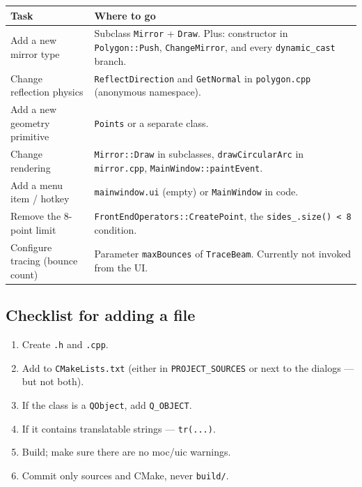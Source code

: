 \documentclass[a4paper,11pt]{article}
\newcommand{\file}[1]{\texttt{#1}}
\newcommand{\code}[1]{\texttt{#1}}
\begin{document}
\begin{longtable}{@{}p{6cm}p{9cm}@{}}
\toprule
\textbf{Task} & \textbf{Where to go} \\ \midrule
\endhead
Add a new mirror type &
Subclass \code{Mirror} + \code{Draw}. Plus: constructor in
\code{Polygon::Push}, \code{ChangeMirror}, and every
\code{dynamic\_cast} branch. \\
\addlinespace
Change reflection physics &
\code{ReflectDirection} and \code{GetNormal} in \file{polygon.cpp}
(anonymous namespace). \\
\addlinespace
Add a new geometry primitive &
\code{Points} or a separate class. \\
\addlinespace
Change rendering &
\code{Mirror::Draw} in subclasses, \code{drawCircularArc} in
\file{mirror.cpp}, \code{MainWindow::paintEvent}. \\
\addlinespace
Add a menu item / hotkey &
\code{mainwindow.ui} (empty) or \code{MainWindow} in code. \\
\addlinespace
Remove the 8-point limit &
\code{FrontEndOperators::CreatePoint}, the
\code{sides\_.size() < 8} condition. \\
\addlinespace
Configure tracing (bounce count) &
Parameter \code{maxBounces} of \code{TraceBeam}. Currently not invoked
from the UI. \\
\bottomrule
\end{longtable}

\subsection{Checklist for adding a file}

\begin{enumerate}[leftmargin=*]
    \item Create \file{.h} and \file{.cpp}.
    \item Add to \code{CMakeLists.txt} (either in
          \code{PROJECT\_SOURCES} or next to the dialogs — but not both).
    \item If the class is a \code{QObject}, add \code{Q\_OBJECT}.
    \item If it contains translatable strings — \code{tr(...)}.
    \item Build; make sure there are no moc/uic warnings.
    \item Commit only sources and CMake, never \file{build/}.
\end{enumerate}

\end{document}
